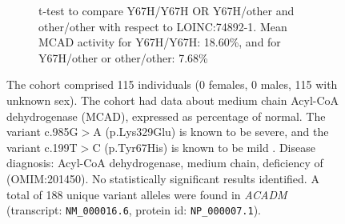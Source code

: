 \begin{figure}[htbp]
\vspace{2em}

\begin{subfigure}[b]{0.95\textwidth}
\captionsetup{justification=raggedright,singlelinecheck=false}
\caption{t-test to compare Y67H/Y67H OR Y67H/other and other/other with respect to LOINC:74892-1. Mean MCAD activity for Y67H/Y67H: 18.60\%, and for Y67H/other or other/other: 7.68\% }
\end{subfigure}

\vspace{2em}

\caption{The cohort comprised 115 individuals (0 females, 0 males, 115 with unknown sex). The cohort had data about  medium chain Acyl-CoA dehydrogenase (MCAD), expressed as percentage of normal.
The variant c.985G$>$A (p.Lys329Glu) is known to be severe, and the variant c.199T$>$C (p.Tyr67His) is known to be mild \cite{PMID_33580884}.
Disease diagnosis: Acyl-CoA dehydrogenase, medium chain, deficiency of (OMIM:201450). No statistically significant results identified. A total of 188 unique variant alleles were found in \textit{ACADM} (transcript: \texttt{NM\_000016.6}, protein id: \texttt{NP\_000007.1}).}
\end{figure}
